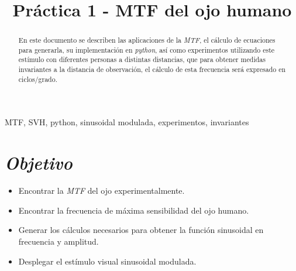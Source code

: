 \documentclass[conference]{IEEEtran}
\begin{document}
\title{Práctica 1 - MTF del ojo humano}


\author{
\and
{}

}

\maketitle


\begin{abstract}
En este documento se describen las aplicaciones de la \textit{MTF}, el cálculo de ecuaciones para generarla, su implementación en \textit{python}, así como experimentos utilizando este estímulo con diferentes personas a distintas distancias, que para obtener medidas invariantes a la distancia de observación, el cálculo de esta frecuencia será expresado en ciclos/grado.
\end{abstract}

\begin{IEEEkeywords}
MTF, SVH, python, sinusoidal modulada, experimentos, invariantes
\end{IEEEkeywords}


\section{\textit{Objetivo}}


\begin{itemize}
\item Encontrar la \textit{MTF} del ojo experimentalmente.
\item Encontrar la frecuencia de máxima sensibilidad del ojo humano.
\item Generar los cálculos necesarios para obtener la función sinusoidal en frecuencia y amplitud.
\item Desplegar el estímulo visual sinusoidal modulada.
\end{itemize}
\end{document}
